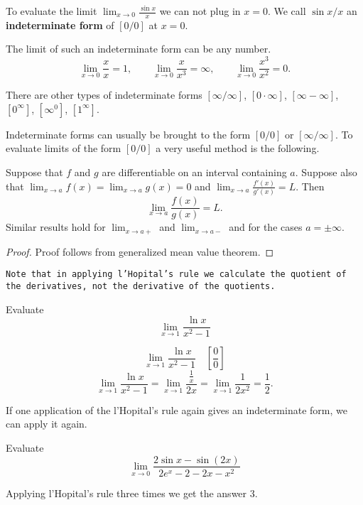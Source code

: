 \documentclass[../main.tex]{subfiles}
\begin{document}
To evaluate the limit $\lim_{x \to 0} \frac{\sin x}{x}$ we can not plug in $x=0$.
We call $\sin x/ x$ an \textbf{indeterminate form} of $[0/0]$ at $x=0$.

The limit of such an indeterminate form can be any number.
\[
  \lim_{x \to 0} \frac{x}{x} = 1, \qquad
  \lim_{x \to 0} \frac{x}{x^3} = \infty, \qquad
  \lim_{x \to 0} \frac{x^3}{x^2} = 0.
\]

There are other types of indeterminate forms $[\infty/\infty]$, $[0 \cdot \infty]$, $[\infty - \infty]$, $[0^{\infty}]$, $[\infty^0]$, $[1^{\infty}]$.

Indeterminate forms can usually be brought to the form $[0/0]$ or $[\infty/\infty]$. To evaluate limits of the form $[0/0]$ a very useful method is the following.
\begin{theorem}
  Suppose that $f$ and $g$ are differentiable on an interval containing $a$. Suppose also that
  $\lim_{x \to a} f(x) = \lim_{x \to a} g(x) = 0$ and $\lim_{x \to a} \frac{f'(x)}{g'(x)} = L$. Then
  \[
    \lim_{x \to a} \frac{f(x)}{g(x)} = L.
  \]
  Similar results hold for $\lim_{x \to a+}$ and $\lim_{x \to a-}$ and for the cases $a= \pm \infty$.
\end{theorem}
\begin{proof}
  Proof follows from generalized mean value theorem.
\end{proof}

\texttt{Note that in applying l'Hopital's rule we calculate the quotient of the derivatives, not the derivative of the quotients.}

\begin{example}
  Evaluate
  \[
    \lim_{x \to 1} \frac{\ln x}{x^2-1}
  \]
\end{example}
\begin{solution}
  \[
    \lim_{x \to 1} \frac{\ln x}{x^2-1} \quad \left[ \frac{0}{0} \right]
  \]
  \[
    \lim_{x \to 1} \frac{\ln x}{x^2-1} =
    \lim_{x \to 1} \frac{\frac{1}{x}}{2x} =
    \lim_{x \to 1} \frac{1}{2x^2} = \frac{1}{2}.
  \]
\end{solution}

If one application of the l'Hopital's rule again gives an indeterminate form, we can apply it again.

\begin{example}
  Evaluate
  \[
    \lim_{x \to 0} \frac{2\sin x-\sin(2x)}{2e^x-2-2x-x^2}
  \]
\end{example}
\begin{solution}
  Applying l'Hopital's rule three times we get the answer $3$.
\end{solution}
\end{document}

